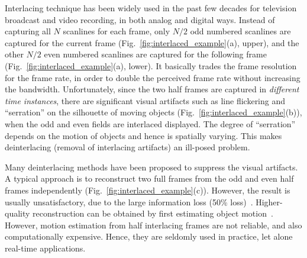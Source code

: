 
Interlacing technique has been widely used in the past few decades for television
broadcast and video recording, in both analog and digital ways. Instead of capturing all
$N$ scanlines for each frame, only $N/2$ odd numbered scanlines are captured for
the current frame (Fig.~\ref{fig:interlaced_example}(a), upper), and the other
$N/2$ even numbered scanlines are captured for the following frame
(Fig.~\ref{fig:interlaced_example}(a), lower). It basically trades the frame
resolution for the frame rate, in order to double the perceived frame rate
without increasing the bandwidth. Unfortunately, since the two half frames are
captured in {\em different time instances}, there are significant visual
artifacts such as line flickering and ``serration'' on the silhouette of moving
objects (Fig.~\ref{fig:interlaced_example}(b)), when the odd and even fields are
interlaced displayed. The degree of ``serration'' depends on the motion of objects
and hence is spatially varying. This makes deinterlacing (removal of interlacing artifacts) an ill-posed problem.




Many deinterlacing methods have been proposed to suppress the visual artifacts.
A typical approach is to reconstruct two full frames from the odd and even half
frames independently (Fig.~\ref{fig:interlaced_example}(c)). However, the result
is usually unsatisfactory, due to the large information 
loss (50\% loss)~\cite{doyle1990interlaced,wang2012efficient,wang2013moving}. 
Higher-quality reconstruction can be obtained by first estimating object 
motion~\cite{jeon2009weighted,mohammadi2012enhanced,lee2013high}. However, motion
estimation from half interlacing frames are not reliable, and also computationally expensive.
Hence, they are seldomly used in practice, 
let alone real-time applications.


